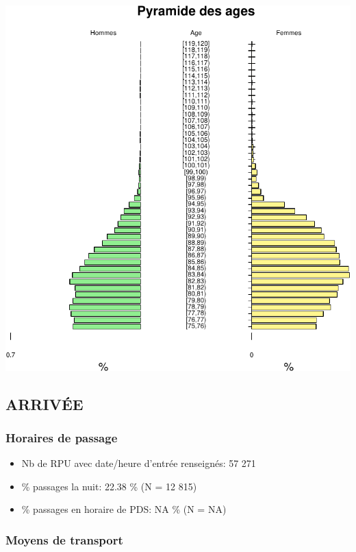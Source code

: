 \documentclass[]{article}
\begin{document}
\includegraphics{rapport2014_V4_files/figure-latex/sous_classe_age-1.pdf}

\subsection{ARRIVÉE}\label{arrivee-1}

\subsubsection{Horaires de passage}\label{horaires-de-passage-1}

\begin{itemize}
\itemsep1pt\parskip0pt
\item
  Nb de RPU avec date/heure d'entrée renseignés: 57 271
\item
  \% passages la nuit: 22.38 \% (N = 12 815)
\item
  \% passages en horaire de PDS: NA \% (N = NA)
\end{itemize}

\subsubsection{Moyens de transport}\label{moyens-de-transport}
\end{document}
